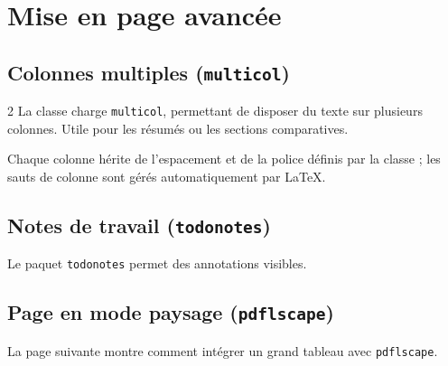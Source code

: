 \documentclass{poly}
\begin{document}
\section{Mise en page avancée}

\subsection{Colonnes multiples (\texttt{multicol})}

\begin{multicols}{2}
La classe charge \texttt{multicol}, permettant de disposer du texte sur
plusieurs colonnes. Utile pour les résumés ou les sections comparatives.

Chaque colonne hérite de l'espacement et de la police définis par la
classe ; les sauts de colonne sont gérés automatiquement par \LaTeX.
\end{multicols}

\subsection{Notes de travail (\texttt{todonotes})}


Le paquet \texttt{todonotes} permet des annotations visibles.

\subsection{Page en mode paysage (\texttt{pdflscape})}

La page suivante montre comment intégrer un grand tableau avec
\texttt{pdflscape}.
\end{document}
